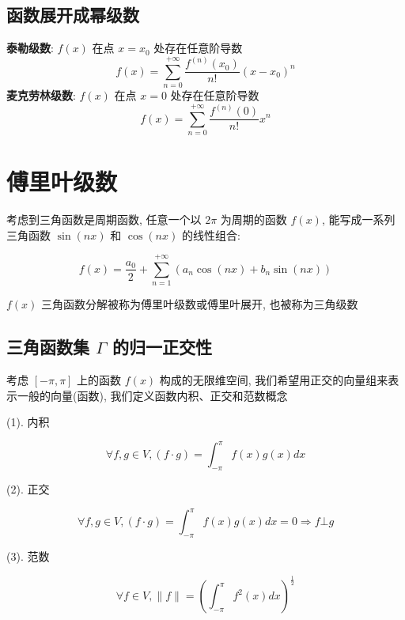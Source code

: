 \subsection{函数展开成幂级数}

\begin{definition}\label{函数展开成幂级数}
	\textbf{泰勒级数}: $f(x)$ 在点 $x=x_{0}$ 处存在任意阶导数
	$$f(x)=\sum\limits_{n=0}^{+\infty}\frac{f^{(n)}(x_{0})}{n!}(x-x_{0})^n$$
	\textbf{麦克劳林级数}: $f(x)$ 在点 $x=0$ 处存在任意阶导数
	$$f(x)=\sum\limits_{n=0}^{+\infty}\frac{f^{(n)}(0)}{n!}x^n$$
\end{definition}
\section{傅里叶级数}

\begin{definition}[傅里叶级数]\label{def: 傅里叶级数}
	考虑到三角函数是周期函数, 任意一个以 $2\pi$ 为周期的函数 $f(x)$, 能写成一系列三角函数 $\sin (nx)$ 和 $\cos (nx)$ 的线性组合:

	$$f(x) = \dfrac{a_{0}}{2} + \sum\limits_{n=1}^{+\infty}(a_{n}\cos (nx)+b_{n}\sin (nx))$$

	$f(x)$ 三角函数分解被称为傅里叶级数或傅里叶展开, 也被称为三角级数 
\end{definition}
\subsection{三角函数集 $\Gamma$ 的归一正交性}
\begin{definition}[内积、正交和范数]
	考虑 $[-\pi,\pi]$ 上的函数 $f(x)$ 构成的无限维空间, 我们希望用正交的向量组来表示一般的向量(函数), 我们定义函数内积、正交和范数概念

	(1). 内积
	
	$$\forall f,g \in V, (f\cdot g) = \int_{-\pi}^{\pi}f(x)g(x)dx $$

	(2). 正交

	$$\forall f,g \in V, (f\cdot g) = \int_{-\pi}^{\pi}f(x)g(x)dx = 0\Rightarrow f \bot g $$

	(3). 范数

	$$\forall f \in V, \parallel f \parallel  = \left(\int_{-\pi}^{\pi}f^{2}(x)dx\right)^{\frac{1}{2}}$$
\end{definition}

